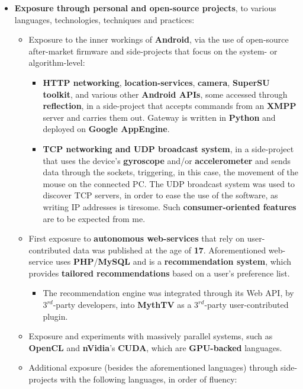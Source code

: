 \documentclass[11pt,a4paper]{article}
\begin{document}
\begin{itemize}
\begin{itemize}
		\end{itemize}
	\item	\textbf{Exposure through personal and open-source projects}, to various languages, technologies, techniques and practices:
		\begin{itemize}
		\item	Exposure to the inner workings of \textbf{Android}, via the use of open-source after-market firmware and side-projects that focus on the system- or algorithm-level:
			\begin{itemize}
			\item	\textbf{HTTP networking}, \textbf{location-services}, \textbf{camera}, \textbf{SuperSU toolkit}, and various other \textbf{Android APIs}, some accessed through \textbf{reflection}, in a side-project that accepts commands from an \textbf{XMPP} server and carries them out. Gateway is written in \textbf{Python} and deployed on \textbf{Google AppEngine}.
			\item	\textbf{TCP networking and UDP broadcast system}, in a side-project that uses the device's \textbf{gyroscope} and/or \textbf{accelerometer} and sends data through the sockets, triggering, in this case, the movement of the mouse on the connected PC. The UDP broadcast system was used to discover TCP servers, in order to ease the use of the software, as writing IP addresses is tiresome. Such \textbf{consumer-oriented features} are to be expected from me.
			\end{itemize}
		\item	First exposure to \textbf{autonomous web-services} that rely on user-contributed data was published at the age of \textbf{17}. Aforementioned web-service uses \textbf{PHP}/\textbf{MySQL} and is a \textbf{recommendation system}, which provides \textbf{tailored recommendations} based on a user's preference list.
			\begin{itemize}
			\item	The recommendation engine was integrated through its Web API, by $3^{rd}$-party developers, into \textbf{MythTV} as a $3^{rd}$-party user-contributed plugin.
			\end{itemize}
		\item	Exposure and experiments with massively parallel systems, such as \textbf{OpenCL} and \textbf{nVidia}'s \textbf{CUDA}, which are \textbf{GPU-backed} languages.
		\item	Additional exposure (besides the aforementioned languages) through side-projects with the following languages, in order of fluency:
			\begin{itemize}

\end{itemize}
\end{itemize}
\end{itemize}
\end{document}
